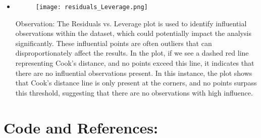 \documentclass{article}
\begin{document}
\begin{itemize}
		\item 
		\begin{figure}[h]
			\centering
			\texttt{[image: residuals\_Leverage.png]}
		\end{figure}
		Observation: The Residuals vs. Leverage plot is used to identify influential observations within the dataset, which could potentially impact the analysis significantly. These influential points are often outliers that can disproportionately affect the results. In the plot, if we see a dashed red line representing Cook’s distance, and no points exceed this line, it indicates that there are no influential observations present. In this instance, the plot shows that Cook’s distance line is only present at the corners, and no points surpass this threshold, suggesting that there are no observations with high influence.
		
		
	\end{itemize}
	\section{Code and References:}
	
	
	
	
\end{document}
